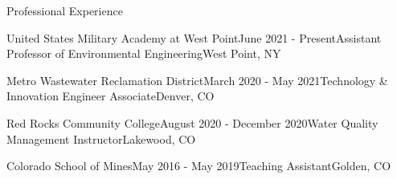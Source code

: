 \documentclass{resume} %
\begin{document}

\begin{rSection}{Professional Experience}

\begin{rSubsection}{United States Military Academy at West Point}{June 2021 - Present}{Assistant Professor of Environmental Engineering}{West Point, NY}
\end{rSubsection}


\begin{rSubsection}{Metro Wastewater Reclamation District}{March 2020 - May 2021}{Technology \& Innovation Engineer Associate}{Denver, CO}
\end{rSubsection}


\begin{rSubsection}{Red Rocks Community College}{August 2020 - December 2020}{Water Quality Management Instructor}{Lakewood, CO}
\end{rSubsection}


\begin{rSubsection}{Colorado School of Mines}{May 2016 - May 2019}{Teaching Assistant}{Golden, CO}
\end{rSubsection}


\\


\end{rSection}
\end{document}
